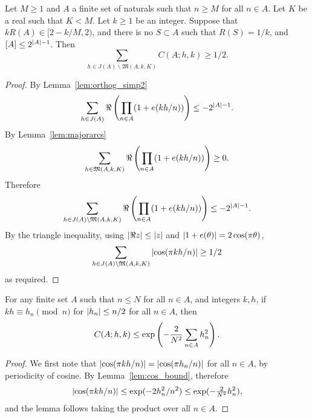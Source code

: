 \begin{lemma}\label{lem:minor_lbound}
Let $M\geq 1$ and $A$ a finite set of naturals such that $n\geq M$ for all $n\in A$. Let $K$ be a real such that $K<M$. Let $k\geq 1$ be an integer. Suppose that $kR(A) \in [2-k/M,2)$, and there is no $S\subset A$ such that $R(S)=1/k$, and $[A]\leq 2^{\left\lvert A\right\rvert-1}$. Then
\[\sum_{h\in J(A)\backslash \mathfrak{M}(A,k,K)} C(A;h,k)\geq 1/2.\]
\end{lemma}
\begin{proof}
By Lemma~\ref{lem:orthog_simp2}
\[\sum_{h\in J(A)}\Re\left( \prod_{n\in A}(1+e(kh/n))\right)\leq -2^{\left\lvert A\right\rvert-1}.\]
By Lemma~\ref{lem:majorarcs}
\[\sum_{h\in \mathfrak{M}(A,k,K)}\Re\left( \prod_{n\in A}(1+e(kh/n))\right) \geq 0.\]
Therefore
\[\sum_{h\in J(A)\backslash \mathfrak{M}(A,k,K)}\Re\left( \prod_{n\in A}(1+e(kh/n))\right)\leq -2^{\left\lvert A\right\rvert-1}.\]
By the triangle inequality, using $\left\lvert \Re z\right\rvert\leq \left\lvert z\right\rvert$ and $\left\lvert 1+e(\theta)\right\rvert=2\cos(\pi \theta)$,
\[\sum_{h\in J(A)\backslash \mathfrak{M}(A,k,K)}\left\lvert \cos(\pi kh/n)\right\rvert \geq 1/2\]
as required.
\end{proof}

\begin{lemma}\label{lem:cos_prod_bound}
For any finite set $A$ such that $n\leq N$ for all $n\in A$, and integers $k,h$, if $kh\equiv h_n\pmod{n}$ for $\left\lvert h_n\right\rvert\leq n/2$ for all $n\in A$, then
\[C(A;h,k)\leq \exp\left( -\frac{2}{N^2}\sum_{n\in A}h_n^2\right).\]
\end{lemma}
\begin{proof}
We first note that $\left\lvert \cos(\pi kh/n)\right\rvert=\left\lvert \cos(\pi h_n/n)\right\rvert$ for all $n\in A$, by periodicity of cosine. By Lemma~\ref{lem:cos_bound}, therefore
\[\left\lvert \cos(\pi kh/n)\right\rvert\leq \exp(-2h_n^2/n^2)\leq \exp(-\tfrac{2}{N^2}h_n^2),\]
and the lemma follows taking the product over all $n\in A$.
\end{proof}


